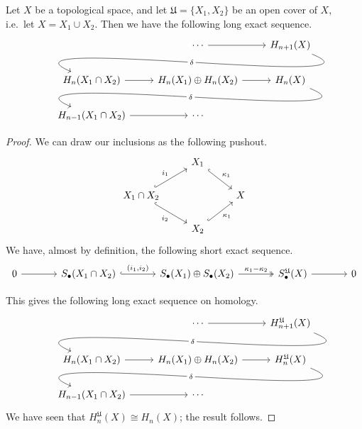 \documentclass[main.tex]{subfiles}
\begin{document}
\begin{theorem}
  \label{thm:mayer_vietoris}
  Let $X$ be a topological space, and let $\mathfrak{U} = \{X_{1}, X_{2}\}$ be an open cover of $X$, i.e.\ let $X = X_{1} \cup X_{2}$. Then we have the following long exact sequence.
  \begin{equation*}
    \begin{tikzcd}
      & \cdots
      \arrow[r]
      & H_{n+1}(X)
      \\
      H_{n}(X_{1} \cap X_{2})
      \arrow[from=urr, out=-22, in=157, looseness=1, overlay, "\delta" description]
      \arrow[r]
      & H_{n}(X_{1}) \oplus H_{n}(X_{2})
      \arrow[r]
      & H_{n}(X)
      \\
      H_{n-1}(X_{1} \cap X_{2})
      \arrow[r]
      \arrow[from=urr, out=-22, in=157, looseness=1, overlay, "\delta" description]
      & \cdots
    \end{tikzcd}
  \end{equation*}
\end{theorem}
\begin{proof}
  We can draw our inclusions as the following pushout.
  \begin{equation*}
    \begin{tikzcd}
      & X_{1}
      \arrow[dr, hook, "\kappa_{1}"]
      \\
      X_{1} \cap X_{2}
      \arrow[ur, hook, "i_{1}"]
      \arrow[dr, hook, swap, "i_{2}"]
      && X
      \\
      & X_{2}
      \arrow[ur, hook, swap, "\kappa_{1}"]
    \end{tikzcd}
  \end{equation*}
  We have, almost by definition, the following short exact sequence.
  \begin{equation*}
    \begin{tikzcd}[column sep=large]
      0
      \arrow[r]
      & S_{\bullet}(X_{1} \cap X_{2})
      \arrow[r, hook, "{(i_{1} , i_{2})}"]
      & S_{\bullet}(X_{1}) \oplus S_{\bullet}(X_{2})
      \arrow[r, two heads, "\kappa_{1} - \kappa_{2}"]
      & S^{\mathfrak{U}}_{\bullet}(X)
      \arrow[r]
      & 0
    \end{tikzcd}
  \end{equation*}

  This gives the following long exact sequence on homology.
  \begin{equation*}
    \begin{tikzcd}
      & \cdots
      \arrow[r]
      & H_{n+1}^{\mathfrak{U}}(X)
      \\
      H_{n}(X_{1} \cap X_{2})
      \arrow[from=urr, out=-22, in=157, looseness=1, overlay, "\delta" description]
      \arrow[r]
      & H_{n}(X_{1}) \oplus H_{n}(X_{2})
      \arrow[r]
      & H_{n}^{\mathfrak{U}}(X)
      \\
      H_{n-1}(X_{1} \cap X_{2})
      \arrow[r]
      \arrow[from=urr, out=-22, in=157, looseness=1, overlay, "\delta" description]
      & \cdots
    \end{tikzcd}
  \end{equation*}
  We have seen that $H^{\mathfrak{U}}_{n}(X) \cong H_{n}(X)$; the result follows.
\end{proof}
\end{document}
